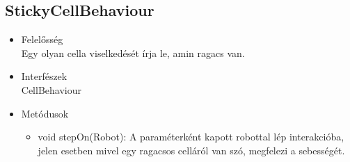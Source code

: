 \subsection{StickyCellBehaviour}
\begin{itemize}
	\item Felelősség\\
	Egy olyan cella viselkedését írja le, amin ragacs van.
	\item Interfészek\\
	CellBehaviour
	\item Metódusok
	\begin{itemize}
		\item void stepOn(Robot): A paraméterként kapott robottal lép interakcióba, jelen esetben mivel egy ragacsos celláról van szó, megfelezi a sebességét.
	\end{itemize}
\end{itemize}
